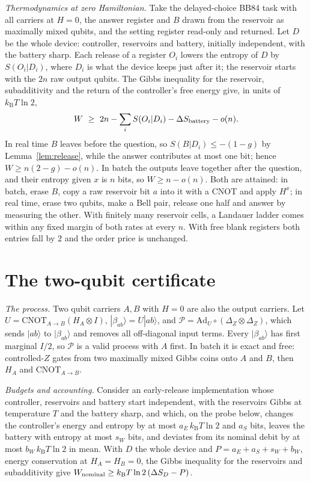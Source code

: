 \documentclass[11pt]{article}
\theoremstyle{definition}
\theoremstyle{remark}
\newcommand{\kB}{k_{\mathrm B}}
\begin{document}
\emph{Thermodynamics at zero Hamiltonian.} Take the delayed-choice BB84 task with all carriers at $H=0$, the answer register and $B$ drawn from the reservoir as maximally mixed qubits, and the setting register read-only and returned. Let $D$ be the whole device: controller, reservoirs and battery, initially independent, with the battery sharp. Each release of a register $O_i$ lowers the entropy of $D$ by $S(O_i|D_i)$, where $D_i$ is what the device keeps just after it; the reservoir starts with the $2n$ raw output qubits. The Gibbs inequality for the reservoir, subadditivity and the return of the controller's free energy give, in units of $\kB T\ln2$,
\[
W\ \ge\ 2n-\sum_iS(O_i|D_i)-\Delta S_{\rm battery}-o(n).
\]
In real time $B$ leaves before the question, so $S(B|D_i)\le-(1-g)$ by Lemma~\ref{lem:release}, while the answer contributes at most one bit; hence $W\ge n(2-g)-o(n)$. In batch the outputs leave together after the question, and their entropy given $x$ is $n$ bits, so $W\ge n-o(n)$. Both are attained: in batch, erase $B$, copy a raw reservoir bit $a$ into it with a CNOT and apply $H^x$; in real time, erase two qubits, make a Bell pair, release one half and answer by measuring the other. With finitely many reservoir cells, a Landauer ladder comes within any fixed margin of both rates at every $n$. With free blank registers both entries fall by $2$ and the order price is unchanged.

\section{The two-qubit certificate}\label{app:certificate}

\emph{The process.} Two qubit carriers $A,B$ with $H=0$ are also the output carriers. Let $U=\mathrm{CNOT}_{A\to B}(H_A\otimes I)$, $|\beta_{ab}\rangle=U|ab\rangle$, and $\mathcal P=\mathrm{Ad}_U\circ(\Delta_Z\otimes\Delta_Z)$, which sends $|ab\rangle$ to $|\beta_{ab}\rangle$ and removes all off-diagonal input terms. Every $|\beta_{ab}\rangle$ has first marginal $I/2$, so $\mathcal P$ is a valid process with $A$ first. In batch it is exact and free: controlled-$Z$ gates from two maximally mixed Gibbs coins onto $A$ and $B$, then $H_A$ and $\mathrm{CNOT}_{A\to B}$.

\emph{Budgets and accounting.} Consider an early-release implementation whose controller, reservoirs and battery start independent, with the reservoirs Gibbs at temperature $T$ and the battery sharp, and which, on the probe below, changes the controller's energy and entropy by at most $a_E\,\kB T\ln2$ and $a_S$ bits, leaves the battery with entropy at most $s_W$ bits, and deviates from its nominal debit by at most $b_W\,\kB T\ln2$ in mean. With $D$ the whole device and $P=a_E+a_S+s_W+b_W$, energy conservation at $H_A=H_B=0$, the Gibbs inequality for the reservoirs and subadditivity give $W_{\rm nominal}\ge\kB T\ln2\,(\Delta S_D-P)$.
\end{document}
